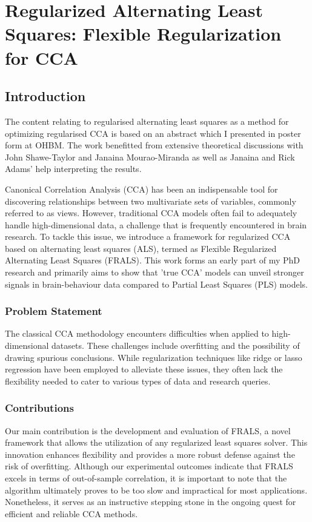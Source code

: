 \chapter{Regularized Alternating Least Squares: Flexible Regularization for CCA}
\label{chap:als}
\minitoc

\section{Introduction}\label{sec:introduction}

The content relating to regularised alternating least squares as a method for optimizing regularised CCA is based on an abstract which I presented in poster form at OHBM. The work benefitted from extensive theoretical discussions with John Shawe-Taylor and Janaina Mourao-Miranda as well as Janaina and Rick Adams' help interpreting the results.

Canonical Correlation Analysis (CCA) has been an indispensable tool for discovering relationships between two multivariate sets of variables, commonly referred to as views. However, traditional CCA models often fail to adequately handle high-dimensional data, a challenge that is frequently encountered in brain research. To tackle this issue, we introduce a framework for regularized CCA based on alternating least squares (ALS), termed as Flexible Regularized Alternating Least Squares (FRALS). This work forms an early part of my PhD research and primarily aims to show that 'true CCA' models can unveil stronger signals in brain-behaviour data compared to Partial Least Squares (PLS) models.

\subsection{Problem Statement}\label{subsec:problem-statement}
The classical CCA methodology encounters difficulties when applied to high-dimensional datasets. These challenges include overfitting and the possibility of drawing spurious conclusions. While regularization techniques like ridge or lasso regression have been employed to alleviate these issues, they often lack the flexibility needed to cater to various types of data and research queries.

\subsection{Contributions}\label{subsec:contributions}
Our main contribution is the development and evaluation of FRALS, a novel framework that allows the utilization of any regularized least squares solver. This innovation enhances flexibility and provides a more robust defense against the risk of overfitting. Although our experimental outcomes indicate that FRALS excels in terms of out-of-sample correlation, it is important to note that the algorithm ultimately proves to be too slow and impractical for most applications. Nonetheless, it serves as an instructive stepping stone in the ongoing quest for efficient and reliable CCA methods.

